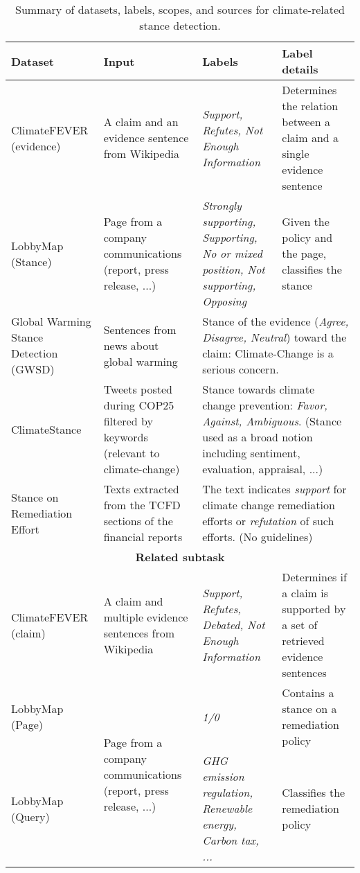 \begin{table}[ht]
\centering
\begin{tabular}{p{3cm}p{4cm}p{3cm}p{4cm}}
\toprule
\textbf{Dataset} & \textbf{Input} & \textbf{Labels}                                                                                  & \textbf{Label details}                                         \\
\midrule
ClimateFEVER (evidence) ~\cite{diggelmann_climate-fever_2020} 
& A claim and an evidence sentence from Wikipedia  & \textit{Support, Refutes, Not Enough Information} & Determines the relation between a claim and a single evidence sentence \\
\midrule
LobbyMap (Stance)~\cite{morio2023an} & Page from a company communications (report, press release, ...) & \textit{Strongly supporting, Supporting, No or mixed position, Not supporting, Opposing} & Given the policy and the page, classifies the stance \\
\midrule
Global Warming Stance Detection (GWSD)~\cite{luo_detecting_2020}  & Sentences from news about global warming & \multicolumn{2}{p{7cm}}{Stance of the evidence (\textit{Agree, Disagree, Neutral}) toward the claim: Climate-Change is a serious concern.} \\
\midrule
ClimateStance~\cite{vaid-etal-2022-towards} & Tweets posted during COP25 filtered by keywords (relevant to climate-change) & \multicolumn{2}{p{7cm}}{Stance towards climate change prevention: \textit{Favor, Against, Ambiguous}. (Stance used as a broad notion including sentiment, evaluation, appraisal, ...)}  \\
\midrule
Stance on Remediation Effort~\cite{lai_using_2023} & Texts extracted from the TCFD sections of the financial reports  & \multicolumn{2}{p{7cm}}{The text indicates \textit{support} for climate change remediation efforts or \textit{refutation} of such efforts. (No guidelines)} \\
\bottomrule
\multicolumn{4}{c}{\textbf{Related subtask}} \\
\toprule
ClimateFEVER (claim) ~\cite{diggelmann_climate-fever_2020}  & A claim and multiple evidence sentences from Wikipedia & \textit{Support, Refutes, Debated, Not Enough Information} & Determines if a claim is supported by a set of retrieved evidence sentences  \\
\midrule
LobbyMap (Page)~\cite{morio2023an} & \multirow{2}{4cm}[-0.25cm]{Page from a company communications (report, press release, ...)} & \textit{1/0} & Contains a stance on a remediation policy  \\
LobbyMap (Query)~\cite{morio2023an} & & \textit{GHG emission regulation, Renewable energy, Carbon tax, ...} & Classifies the remediation policy \\
\bottomrule
\end{tabular}
\caption{Summary of datasets, labels, scopes, and sources for climate-related stance detection.}
\label{tab:datasets_stance}
\end{table}

